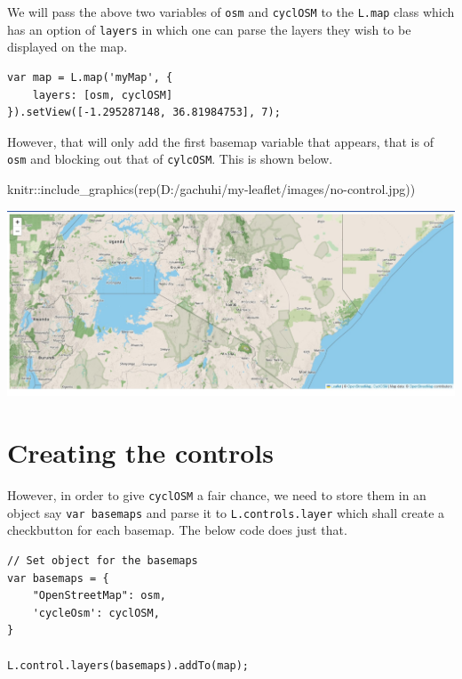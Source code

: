 \documentclass[
]{book}
\newenvironment{Shaded}{\begin{snugshade}}{\end{snugshade}}
\newcommand{\FunctionTok}[1]{\textcolor[rgb]{0.00,0.00,0.00}{#1}}
\newcommand{\NormalTok}[1]{#1}
\newcommand{\SpecialCharTok}[1]{\textcolor[rgb]{0.00,0.00,0.00}{#1}}
\newcommand{\StringTok}[1]{\textcolor[rgb]{0.31,0.60,0.02}{#1}}
\begin{document}
We will pass the above two variables of \texttt{osm} and \texttt{cyclOSM} to the \texttt{L.map} class which has an option of \texttt{layers} in which one can parse the layers they wish to be displayed on the map.

\begin{verbatim}
var map = L.map('myMap', {
    layers: [osm, cyclOSM]
}).setView([-1.295287148, 36.81984753], 7);
\end{verbatim}

However, that will only add the first basemap variable that appears, that is of \texttt{osm} and blocking out that of \texttt{cylcOSM}. This is shown below.

\begin{Shaded}
\begin{Highlighting}[]
\NormalTok{knitr}\SpecialCharTok{::}\FunctionTok{include\_graphics}\NormalTok{(}\FunctionTok{rep}\NormalTok{(}\StringTok{\textquotesingle{}D:/gachuhi/my{-}leaflet/images/no{-}control.jpg\textquotesingle{}}\NormalTok{))}
\end{Highlighting}
\end{Shaded}

\includegraphics[width=26.61in]{../images/no-control}

\hypertarget{creating-the-controls}{%
\section{Creating the controls}\label{creating-the-controls}}

However, in order to give \texttt{cyclOSM} a fair chance, we need to store them in an object say \texttt{var\ basemaps} and parse it to \texttt{L.controls.layer} which shall create a checkbutton for each basemap. The below code does just that.

\begin{verbatim}
// Set object for the basemaps
var basemaps = {
    "OpenStreetMap": osm,
    'cycleOsm': cyclOSM,
}

L.control.layers(basemaps).addTo(map);

\end{verbatim}
\end{document}
